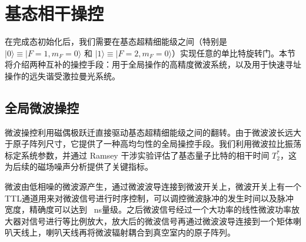 \documentclass[../main.tex]{subfiles}
\begin{document}




\section{基态相干操控}
\label{sec:ground_control}

在完成态初始化后，我们需要在基态超精细能级之间（特别是 $|0\rangle \equiv |F=1, m_F=0\rangle$ 和 $|1\rangle \equiv |F=2, m_F=0\rangle$）实现任意的单比特旋转门。本节将介绍两种互补的操控手段：用于全局操作的高精度微波系统，以及用于快速寻址操作的远失谐受激拉曼光系统。

\subsection{全局微波操控}
\label{ch4:sec:microwave}

微波操控利用磁偶极跃迁直接驱动基态超精细能级之间的翻转。由于微波波长远大于原子阵列尺寸，它提供了一种高均匀性的全局操控手段。我们利用微波拉比振荡标定系统参数，并通过 Ramsey 干涉实验评估了基态量子比特的相干时间 $T_2^*$，这为后续的磁场噪声分析提供了关键指标。

微波由低相噪的微波源产生，通过微波波导连接到微波开关上，微波开关上有一个TTL通道用来对微波信号进行时序控制，可以调控微波脉冲的发生时间以及脉冲宽度，精确度可以达到 \SI{}{\ns}量级。之后微波信号经过一个大功率的线性微波功率放大器对信号进行等比例放大，放大后的微波信号再通过微波波导连接到一个矩体喇叭天线上，喇叭天线再将微波辐射耦合到真空室内的原子阵列。
\end{document}
